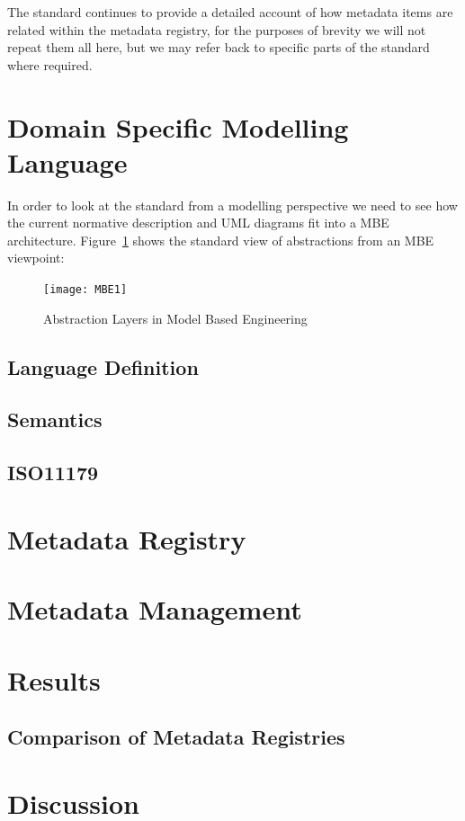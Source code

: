\documentclass{llncs}
\begin{document}
The standard continues to provide a detailed account of how metadata items are related within the metadata registry, for the purposes of brevity we will not repeat them all here, but we may refer back to specific parts of the standard where required.


\section{Domain Specific Modelling Language}

In order to look at the standard from a modelling perspective we need to see how the current normative description and UML diagrams fit into a MBE architecture. Figure~\ref{fig:mbe1} shows the standard view of abstractions from an MBE viewpoint:

\begin{figure}[h]
\texttt{[image: MBE1]}
\caption{Abstraction Layers in Model Based Engineering} 
\label{fig:mbe1}
\end{figure}








\subsection{Language Definition}

\subsection{Semantics}


\subsection{ISO11179}



\section{Metadata Registry}

\subsection{}


\section{Metadata Management}



\section{Results}

\subsection{Comparison of Metadata Registries}


\section{Discussion}

 


\newpage




\end{document}

